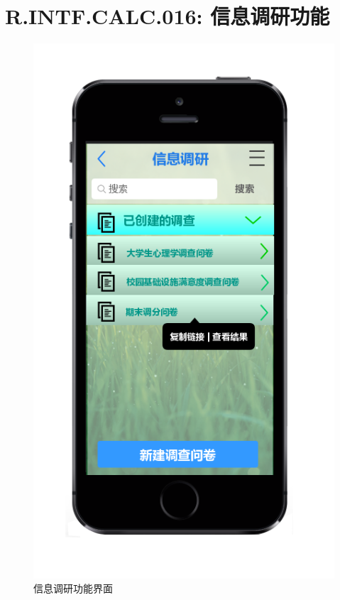     \section{\color{red}R.INTF.CALC.016: 信息调研功能}
    \begin{figure}[h]
        \centering
        \includegraphics[scale=0.6]{OutlineDesign/figures/信息调研功能界面.png}
        \caption{\color{red}信息调研功能界面}
        \label{fig:server_flow}
    \end{figure}
    \newpage
